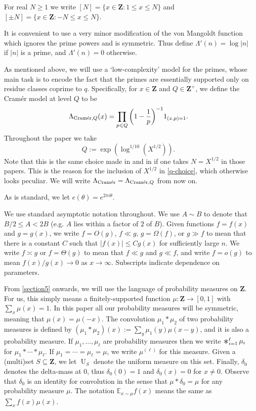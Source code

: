 \documentclass[11pt,reqno]{amsart}
\numberwithin{equation}{section}
\theoremstyle{definition}
\theoremstyle{remark}
\newcommand{\mb}{\mathbb}
\renewcommand{\le}{\leqslant}
\renewcommand{\ge}{\geqslant}
\newcommand\Z{\mathbf{Z}}
\newcommand\E{\mb{E}}
\newcommand\cramer{{\textnormal{Cram\'er}}}
\newcommand\qq{Q}
\newcommand\Unif{\operatorname{U}}
\newcommand{\conv}{\mathop{\scalebox{1.5}{\raisebox{-0.2ex}{$\ast$}}}}
\begin{document}
For real $N \ge 1$ we write $[N] = \{ x \in \Z : 1 \le x \le N\}$ and $[\pm N] = \{ x \in \Z : -N \le x \le N\}$.

It is convenient to use a very minor modification of the von Mangoldt function which ignores the prime powers and is symmetric. Thus define $\Lambda'(n) = \log |n|$ if $|n|$ is a prime, and $\Lambda'(n) = 0$ otherwise.

As mentioned above, we will use a `low-complexity' model for the primes, whose main task is to encode the fact that the primes are essentially supported only on residue classes coprime to $q$. Specifically, for $x\in \Z$ and $Q \in \Z^{+}$, we define the Cram\'er model at level $\qq$ to be  
\begin{equation}\label{cramer-def} \Lambda_{\cramer, \qq}(x) = \prod_{p\le \qq}\bigg(1 - \frac{1}{p}\bigg)^{-1} 1_{(x,p) = 1}.\end{equation}
Throughout the paper we take 
\begin{equation}\label{q-choice} \qq := \exp(\log^{1/10} (X^{1/2})).\end{equation} Note that this is the same choice made in \cite[Equation (1.1)]{TT21} and in \cite[Section 5]{Len23b} if one takes $N = X^{1/2}$ in those papers. This is the reason for the inclusion of $X^{1/2}$ in \cref{q-choice}, which otherwise looks peculiar.
We will write $\Lambda_{\cramer} = \Lambda_{\cramer,\qq}$ from now on.

As is standard, we let $e(\theta) = e^{2\pi i\theta}$. 

We use standard asymptotic notation throughout. We use $A\sim B$ to denote that $B/2\le A<2B$ (e.g. $A$ lies within a factor of $2$ of $B$). Given functions $f=f(x)$ and $g=g(x)$, we write $f=O(g)$, $f\ll g$, $g=\Omega(f)$, or $g\gg f$ to mean that there is a constant $C$ such that $|f(x)|\le Cg(x)$ for sufficiently large $n$. We write $f\asymp g$ or $f=\Theta(g)$ to mean that $f\ll g$ and $g\ll f$, and write $f=o(g)$ to mean $f(x)/g(x)\to0$ as $x\to\infty$. Subscripts indicate dependence on parameters.

From \cref{section5} onwards, we will use the language of probability measures on $\Z$. For us, this simply means a finitely-supported function $\mu : \Z \rightarrow [0,1]$ with $\sum_x \mu(x) = 1$. In this paper all our probability measures will be symmetric, meaning that $\mu(x) = \mu(-x)$. The convolution $\mu_1 \ast \mu_2$ of two probability measures is defined by $(\mu_1 \ast \mu_2)(x) := \sum_y \mu_1(y) \mu(x - y)$, and it is also a probability measure. If $\mu_1,\dots, \mu_{\ell}$ are probability measures then we write $\conv_{i = 1}^{\ell} \mu_i$ for $\mu_1 \ast \cdots \ast \mu_\ell$. If $\mu_1 = \cdots = \mu_{\ell} = \mu$, we write $\mu^{(\ell)}$ for this measure. Given a (multi)set $S\subseteq \Z$, we let $\Unif_S$ denote the uniform measure on this set. Finally, $\delta_0$ denotes the delta-mass at $0$, thus $\delta_0(0) = 1$ and $\delta_0(x) = 0$ for $x \neq 0$. Observe that $\delta_0$ is an identity for convolution in the sense that $\mu \ast \delta_0 = \mu$ for any probability measure $\mu$. The notation $\E_{x \sim \mu} f(x)$ means the same as $\sum_x f(x) \mu(x)$.
\end{document}
